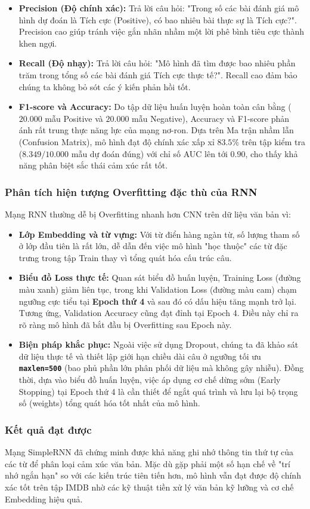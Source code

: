 \begin{itemize}
    \item \textbf{Precision (Độ chính xác):} Trả lời câu hỏi: "Trong số các bài đánh giá mô hình dự đoán là Tích cực (Positive), có bao nhiêu bài thực sự là Tích cực?". Precision cao giúp tránh việc gắn nhãn nhầm một lời phê bình tiêu cực thành khen ngợi.
    \item \textbf{Recall (Độ nhạy):} Trả lời câu hỏi: "Mô hình đã tìm được bao nhiêu phần trăm trong tổng số các bài đánh giá Tích cực thực tế?". Recall cao đảm bảo chúng ta không bỏ sót các ý kiến phản hồi tốt.
    \item \textbf{F1-score và Accuracy:} Do tập dữ liệu huấn luyện hoàn toàn cân bằng ($20.000$ mẫu Positive và $20.000$ mẫu Negative), Accuracy và F1-score phản ánh rất trung thực năng lực của mạng nơ-ron. Dựa trên Ma trận nhầm lẫn (Confusion Matrix), mô hình đạt độ chính xác xấp xỉ $83.5\%$ trên tập kiểm tra ($8.349 / 10.000$ mẫu dự đoán đúng) với chỉ số AUC lên tới $0.90$, cho thấy khả năng phân biệt sắc thái cảm xúc rất tốt.
\end{itemize}

\subsubsection{Phân tích hiện tượng Overfitting đặc thù của RNN}
Mạng RNN thường dễ bị Overfitting nhanh hơn CNN trên dữ liệu văn bản vì:

\begin{itemize}
    \item \textbf{Lớp Embedding và từ vựng:} Với từ điển hàng ngàn từ, số lượng tham số ở lớp đầu tiên là rất lớn, dễ dẫn đến việc mô hình "học thuộc" các từ đặc trưng trong tập Train thay vì tổng quát hóa cấu trúc câu.
    \item \textbf{Biểu đồ Loss thực tế:} Quan sát biểu đồ huấn luyện, Training Loss (đường màu xanh) giảm liên tục, trong khi Validation Loss (đường màu cam) chạm ngưỡng cực tiểu tại \textbf{Epoch thứ 4} và sau đó có dấu hiệu tăng mạnh trở lại. Tương ứng, Validation Accuracy cũng đạt đỉnh tại Epoch 4. Điều này chỉ ra rõ ràng mô hình đã bắt đầu bị Overfitting sau Epoch này.
    \item \textbf{Biện pháp khắc phục:} Ngoài việc sử dụng Dropout, chúng ta đã khảo sát dữ liệu thực tế và thiết lập giới hạn chiều dài câu ở ngưỡng tối ưu \textbf{\texttt{maxlen=500}} (bao phủ phần lớn phân phối dữ liệu mà không gây nhiễu). Đồng thời, dựa vào biểu đồ huấn luyện, việc áp dụng cơ chế dừng sớm (Early Stopping) tại Epoch thứ 4 là cần thiết để ngắt quá trình và lưu lại bộ trọng số (weights) tổng quát hóa tốt nhất của mô hình.
\end{itemize}

\subsubsection{Kết quả đạt được}
Mạng SimpleRNN đã chứng minh được khả năng ghi nhớ thông tin thứ tự của các từ để phân loại cảm xúc văn bản. Mặc dù gặp phải một số hạn chế về "trí nhớ ngắn hạn" so với các kiến trúc tiên tiến hơn, mô hình vẫn đạt được độ chính xác tốt trên tập IMDB nhờ các kỹ thuật tiền xử lý văn bản kỹ lưỡng và cơ chế Embedding hiệu quả.
